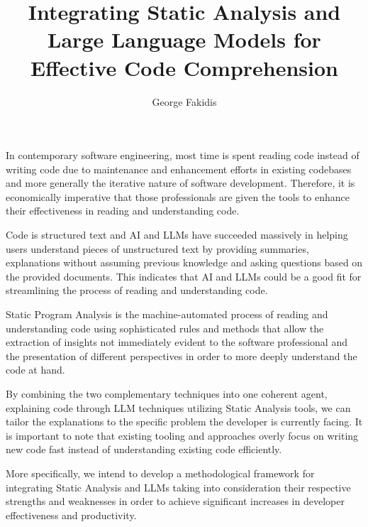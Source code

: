 \documentclass[16pt]{article}
\title{Integrating Static Analysis and Large Language Models for Effective Code Comprehension}
\author{George Fakidis}
\affil{Athens University of Economics and business \\ Department of Computer Science}
\date{}
\begin{document}
    \maketitle

    \large
    In contemporary software engineering, most time is spent reading code instead of writing code
    due to maintenance and enhancement efforts in existing codebases and more generally the iterative nature of software development.
    Therefore, it is economically imperative that those professionals are given the tools to enhance their effectiveness in reading and understanding code.

    Code is structured text and AI and LLMs have succeeded massively in helping users
    understand pieces of unstructured text by providing summaries, explanations without assuming
    previous knowledge and asking questions based on the provided documents.
    This indicates that AI and LLMs could be a good fit for streamlining the process of reading and understanding code.

    Static Program Analysis is the machine-automated process of reading and understanding
    code using sophisticated rules and methods that allow the extraction of insights not immediately
    evident to the software professional and the presentation of different perspectives in order to
    more deeply understand the code at hand.

    By combining the two complementary techniques into one coherent agent,
    explaining code through LLM techniques utilizing Static Analysis tools,
    we can tailor the explanations to the specific problem the developer is currently facing.
    It is important to note that existing tooling and approaches overly focus on writing new code fast
    instead of understanding existing code efficiently.

    More specifically, we intend to develop a methodological framework for integrating
    Static Analysis and LLMs taking into consideration their respective strengths and
    weaknesses in order to achieve significant increases in developer effectiveness and productivity.
\end{document}
